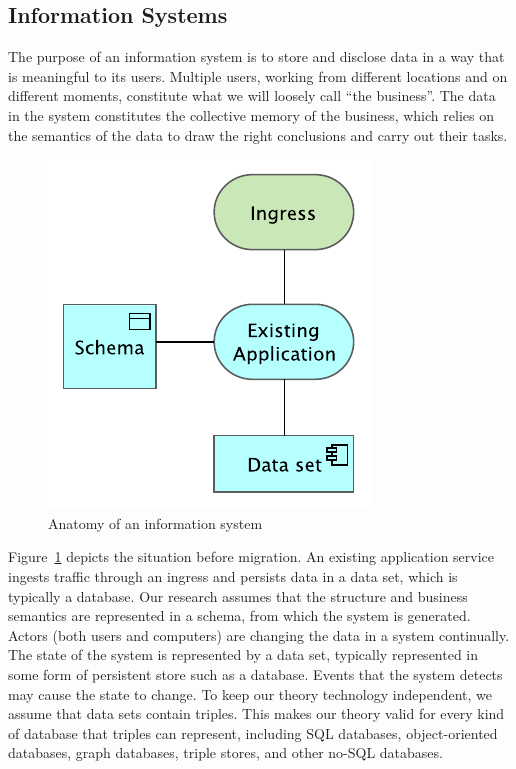 \documentclass[runningheads]{llncs}
\begin{document}
\subsection{Information Systems}
   The purpose of an information system is to store and disclose data in a way that is meaningful to its users.
   Multiple users, working from different locations and on different moments, constitute what we will loosely call ``the business''.
   The data in the system constitutes the collective memory of the business,
   which relies on the semantics of the data to draw the right conclusions and carry out their tasks.
   \begin{figure}[bht]
      \begin{center}
        \includegraphics[scale=0.8]{figures/existing system.pdf}
      \end{center}
   \caption{Anatomy of an information system}
   \label{fig:pre-migration}
   \end{figure}
   
   Figure~\ref{fig:pre-migration} depicts the situation before migration.
   An existing application service ingests traffic through an ingress and persists data in a data set, which is typically a database.
   Our research assumes that the structure and business semantics are represented in a schema, from which the system is generated.
   Actors (both users and computers) are changing the data in a system continually.
   The state of the system is represented by a data set, typically represented in some form of persistent store such as a database.
   Events that the system detects may cause the state to change.
   To keep our theory technology independent, we assume that data sets contain triples.
   This makes our theory valid for every kind of database that triples can represent,
   including SQL databases, object-oriented databases, graph databases, triple stores, and other no-SQL databases.
\end{document}
